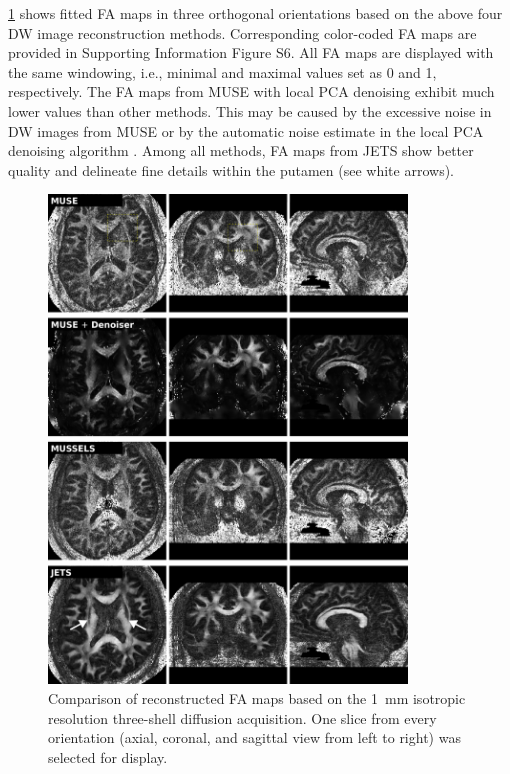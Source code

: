 \documentclass[preprint,12pt,authoryear,review]{elsarticle}
\begin{document}
    \cref{FIG:1.0mm_FA} shows fitted FA maps
    in three orthogonal orientations
    based on the above four DW image reconstruction methods.
    Corresponding color-coded FA maps are provided
    in Supporting Information Figure S6.
    All FA maps are displayed with the same windowing,
    i.e., minimal and maximal values set as 0 and 1, respectively.
    The FA maps from MUSE with local PCA denoising
    exhibit much lower values than other methods.
    This may be caused by the excessive noise in DW images from MUSE
    or by the automatic noise estimate in the local PCA denoising algorithm
    \citep{veraart_2016_denoise}.
    Among all methods, FA maps from JETS show better quality
    and delineate fine details within the putamen (see white arrows).

    \begin{figure}
        \centering
        \includegraphics[width=0.85\textwidth]{../figures/fig4.png}
        \caption{Comparison of reconstructed FA maps based on
            the \SI{1}{mm} isotropic resolution
        three-shell diffusion acquisition.
        One slice from every orientation
        (axial, coronal, and sagittal view from left to right)
        was selected for display.}
        \label{FIG:1.0mm_FA}
    \end{figure}
\end{document}
